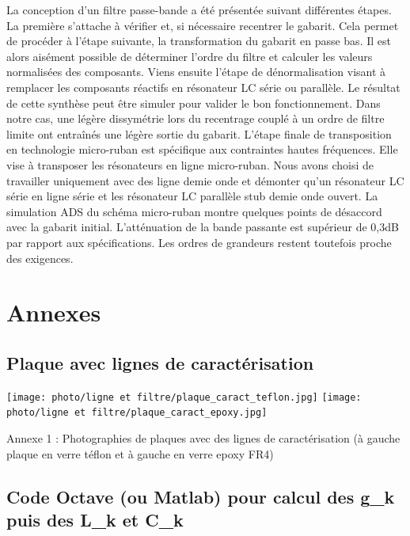 \documentclass[french]{article}
\begin{document}
La conception d'un filtre passe-bande a été présentée suivant différentes étapes. La première s'attache à vérifier et, si nécessaire recentrer le gabarit. Cela permet de procéder à l'étape suivante, la transformation du gabarit en passe bas. Il est alors aisément possible de déterminer l'ordre du filtre et calculer les valeurs normalisées des composants. Viens ensuite l'étape de dénormalisation visant à remplacer les composants réactifs en résonateur LC série ou parallèle. Le résultat de cette synthèse peut être simuler pour valider le bon fonctionnement. Dans notre cas, une légère dissymétrie lors du recentrage couplé à un ordre de filtre limite ont entraînés une légère sortie du gabarit. L'étape finale de transposition en technologie micro-ruban est spécifique aux contraintes hautes fréquences. Elle vise à transposer les résonateurs en ligne micro-ruban. Nous avons choisi de travailler uniquement avec des ligne demie onde et démonter qu'un résonateur LC série en ligne série et les résonateur LC parallèle stub demie onde ouvert. La simulation ADS du schéma micro-ruban montre quelques points de désaccord avec la gabarit initial. L'atténuation de la bande passante est supérieur de 0,3dB par rapport aux spécifications. Les ordres de grandeurs restent toutefois proche des exigences.  



\newpage
\cite{cours_MF} \cite{cours_HF} \cite{data_fr4} \cite{data_PTFE}
{}

\newpage

\section*{Annexes}

\subsection*{Plaque avec lignes de caractérisation}
\texttt{[image: photo/ligne et filtre/plaque\_caract\_teflon.jpg]}
\texttt{[image: photo/ligne et filtre/plaque\_caract\_epoxy.jpg]}
\begin{center}
	Annexe 1 : Photographies de plaques avec des lignes de caractérisation (à gauche plaque en verre téflon et à gauche en verre epoxy FR4)
\end{center}

\newpage
\subsection*{Code Octave (ou Matlab) pour calcul des g\_k puis des L\_k et C\_k}
\end{document}
